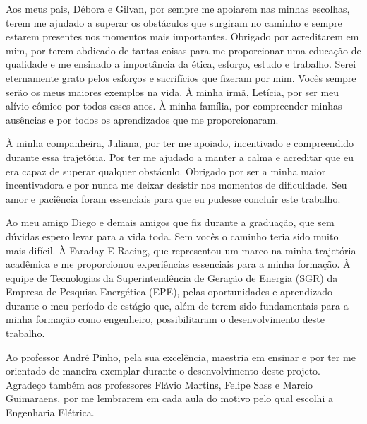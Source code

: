 \begin{agradecimentos}
\sloppy	

Aos meus pais, Débora e Gilvan, por sempre me apoiarem nas minhas escolhas, terem me ajudado a superar os obstáculos 
que surgiram no caminho e sempre estarem presentes nos momentos mais importantes. Obrigado por acreditarem em mim, por 
terem abdicado de tantas coisas para me proporcionar uma educação de qualidade e me ensinado a importância da ética, esforço, 
estudo e trabalho. Serei eternamente grato pelos esforços e sacrifícios que fizeram por mim. Vocês sempre serão os meus 
maiores exemplos na vida. À minha irmã, Letícia, por ser meu alívio cômico por todos esses anos. À minha família, por compreender 
minhas ausências e por todos os aprendizados que me proporcionaram.

À minha companheira, Juliana, por ter me apoiado, incentivado e compreendido durante essa trajetória. Por ter me 
ajudado a manter a calma e acreditar que eu era capaz de superar qualquer obstáculo. Obrigado por ser a
minha maior incentivadora e por nunca me deixar desistir nos momentos de dificuldade. Seu amor e paciência foram
essenciais para que eu pudesse concluir este trabalho.

Ao meu amigo Diego e demais amigos que fiz durante a graduação, que sem dúvidas espero levar para a vida toda. Sem vocês o caminho
teria sido muito mais difícil. À Faraday E-Racing, que representou um marco na minha trajetória acadêmica e me proporcionou 
experiências essenciais para a minha formação. À equipe de Tecnologias da Superintendência de Geração de 
Energia (SGR) da Empresa de Pesquisa Energética (EPE), pelas oportunidades e aprendizado durante o meu período de estágio 
que, além de terem sido fundamentais para a minha formação como engenheiro, possibilitaram o desenvolvimento deste trabalho. 

Ao professor André Pinho, pela sua excelência, maestria em ensinar e por ter me orientado de maneira exemplar durante 
o desenvolvimento deste projeto. Agradeço também aos professores Flávio Martins, Felipe Sass e Marcio Guimaraens, por me 
lembrarem em cada aula do motivo pelo qual escolhi a Engenharia Elétrica.

\end{agradecimentos}
